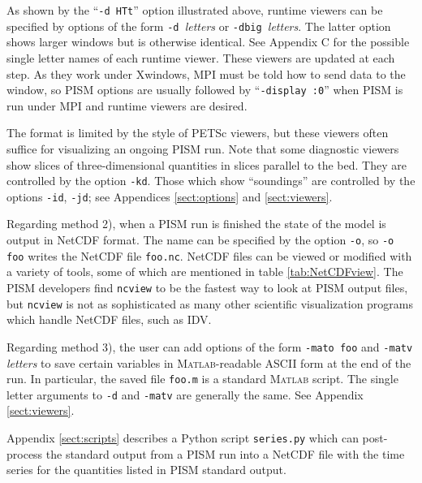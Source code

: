 \documentclass[11pt,final]{amsart}
\renewcommand{\t}[1]{\texttt{#1}}
\newcommand{\Matlab}{\textsc{Matlab}\xspace}
\begin{document}
As shown by the ``\verb|-d HTt|'' option illustrated above, runtime viewers can be specified by options of the form \verb|-d |\emph{letters} or \verb|-dbig |\emph{letters}.  The latter option shows larger windows but is otherwise identical.  See Appendix C for the possible single letter names of each runtime viewer.  These viewers are updated at each step.  As they work under Xwindows, MPI must be told how to send data to the window, so PISM options are usually followed by ``\verb|-display :0|'' when PISM is run under MPI and runtime viewers are desired.

The format is limited by the style of PETSc viewers, but these viewers often suffice for visualizing an ongoing PISM run.  Note that some diagnostic viewers show slices of three-dimensional quantities in slices parallel to the bed.  They are controlled by the option \verb|-kd|.  Those which show ``soundings'' are controlled by the options \verb|-id|, \verb|-jd|; see Appendices \ref{sect:options} and \ref{sect:viewers}.

Regarding method 2), when a PISM run is finished the state of the model is output in NetCDF format.  The name can be specified by the option \verb|-o|, so \verb|-o foo| writes the NetCDF file \verb|foo.nc|.  NetCDF files can be viewed or modified with a variety of tools, some of which are mentioned in table \ref{tab:NetCDFview}.  The PISM developers find \t{ncview} to be the fastest way to look at PISM output files, but \verb|ncview| is not as sophisticated as many other scientific visualization programs which handle NetCDF files, such as IDV.

Regarding method 3), the user can add options of the form \verb|-mato foo| and \verb|-matv |\emph{letters} to save certain variables in \Matlab-readable ASCII form at the end of the run.  In particular, the saved file \verb|foo.m| is a standard \Matlab script.  The single letter arguments to \verb|-d| and \verb|-matv| are generally the same.  See Appendix \ref{sect:viewers}.

Appendix \ref{sect:scripts} describes a Python script \verb|series.py| which can post-process the standard output from a PISM run into a NetCDF file with the time series for the quantities listed in PISM standard output.
\end{document}
